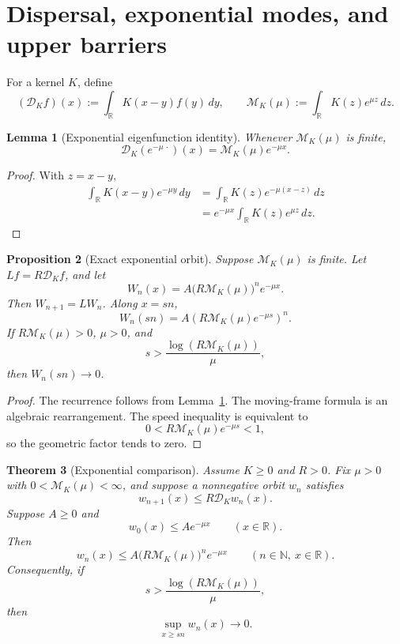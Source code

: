 \documentclass[11pt]{article}
\newtheorem{theorem}{Theorem}[section]
\newtheorem{proposition}[theorem]{Proposition}
\newtheorem{lemma}[theorem]{Lemma}
\theoremstyle{definition}
\newcommand{\R}{\mathbb R}
\newcommand{\N}{\mathbb N}
\newcommand{\M}{\mathcal M}
\newcommand{\D}{\mathcal D}
\begin{document}
\section{Dispersal, exponential modes, and upper barriers}

For a kernel \(K\), define
\[
  (\D_Kf)(x):=\int_{\R}K(x-y)f(y)\,dy,
  \qquad
  \M_K(\mu):=\int_{\R}K(z)e^{\mu z}\,dz.
\]

\begin{lemma}[Exponential eigenfunction identity]
\label{lem:eigenfunction}
Whenever \(\M_K(\mu)\) is finite,
\[
  \D_K(e^{-\mu\,\cdot})(x)
  =
  \M_K(\mu)e^{-\mu x}.
\]
\end{lemma}

\begin{proof}
With \(z=x-y\),
\begin{align*}
  \int_{\R}K(x-y)e^{-\mu y}\,dy
  &=
  \int_{\R}K(z)e^{-\mu(x-z)}\,dz\\
  &=
  e^{-\mu x}\int_{\R}K(z)e^{\mu z}\,dz.
\end{align*}
\end{proof}

\begin{proposition}[Exact exponential orbit]
\label{prop:exponential-orbit}
Suppose \(\M_K(\mu)\) is finite.  Let \(Lf=R\D_Kf\), and let
\[
  W_n(x)=A\bigl(R\M_K(\mu)\bigr)^n e^{-\mu x}.
\]
Then \(W_{n+1}=LW_n\).  Along \(x=sn\),
\[
  W_n(sn)
  =
  A\left(R\M_K(\mu)e^{-\mu s}\right)^n.
\]
If \(R\M_K(\mu)>0\), \(\mu>0\), and
\[
  s>\frac{\log(R\M_K(\mu))}{\mu},
\]
then \(W_n(sn)\to0\).
\end{proposition}

\begin{proof}
The recurrence follows from Lemma~\ref{lem:eigenfunction}.  The moving-frame
formula is an algebraic rearrangement.  The speed inequality is equivalent
to
\[
  0<R\M_K(\mu)e^{-\mu s}<1,
\]
so the geometric factor tends to zero.
\end{proof}

\begin{theorem}[Exponential comparison]
\label{thm:barrier}
Assume \(K\geq0\) and \(R>0\).  Fix \(\mu>0\) with
\(0<\M_K(\mu)<\infty\), and suppose a nonnegative orbit \(w_n\) satisfies
\[
  w_{n+1}(x)\leq R\D_Kw_n(x).
\]
Suppose \(A\geq0\) and
\[
  w_0(x)\leq Ae^{-\mu x}
  \qquad (x\in\R).
\]
Then
\[
  w_n(x)\leq
  A\bigl(R\M_K(\mu)\bigr)^n e^{-\mu x}
  \qquad (n\in\N,\ x\in\R).
\]
Consequently, if
\[
  s>\frac{\log(R\M_K(\mu))}{\mu},
\]
then
\[
  \sup_{x\geq sn}w_n(x)\longrightarrow0.
\]
\end{theorem}
\end{document}
